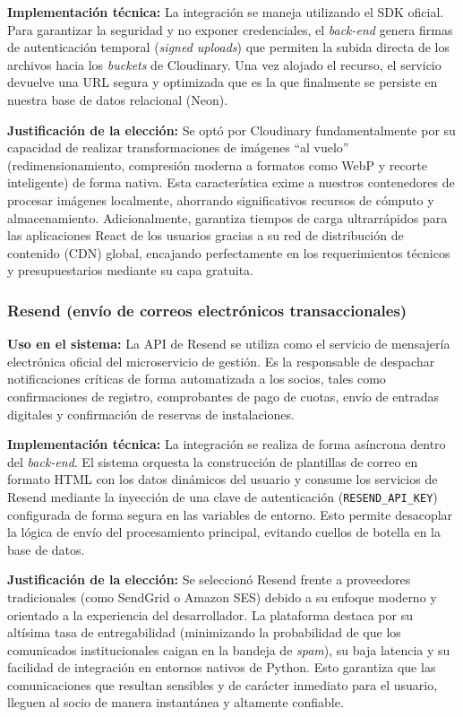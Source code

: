 \textbf{Implementación técnica:} La integración se maneja utilizando el SDK oficial. Para garantizar la seguridad y no exponer credenciales, el \textit{back-end} genera firmas de autenticación temporal (\textit{signed uploads}) que permiten la subida directa de los archivos hacia los \textit{buckets} de Cloudinary. Una vez alojado el recurso, el servicio devuelve una URL segura y optimizada que es la que finalmente se persiste en nuestra base de datos relacional (Neon).

\textbf{Justificación de la elección:} Se optó por Cloudinary fundamentalmente por su capacidad de realizar transformaciones de imágenes ``al vuelo'' (redimensionamiento, compresión moderna a formatos como WebP y recorte inteligente) de forma nativa. Esta característica exime a nuestros contenedores de procesar imágenes localmente, ahorrando significativos recursos de cómputo y almacenamiento. Adicionalmente, garantiza tiempos de carga ultrarrápidos para las aplicaciones React de los usuarios gracias a su red de distribución de contenido (CDN) global, encajando perfectamente en los requerimientos técnicos y presupuestarios mediante su capa gratuita.

\subsubsection{Resend (envío de correos electrónicos transaccionales)}

\textbf{Uso en el sistema:} La API de Resend se utiliza como el servicio de mensajería electrónica oficial del microservicio de gestión. Es la responsable de despachar notificaciones críticas de forma automatizada a los socios, tales como confirmaciones de registro, comprobantes de pago de cuotas, envío de entradas digitales y confirmación de reservas de instalaciones.

\textbf{Implementación técnica:} La integración se realiza de forma asíncrona dentro del \textit{back-end}. El sistema orquesta la construcción de plantillas de correo en formato HTML con los datos dinámicos del usuario y consume los servicios de Resend mediante la inyección de una clave de autenticación (\texttt{RESEND\_API\_KEY}) configurada de forma segura en las variables de entorno. Esto permite desacoplar la lógica de envío del procesamiento principal, evitando cuellos de botella en la base de datos.

\textbf{Justificación de la elección:} Se seleccionó Resend frente a proveedores tradicionales (como SendGrid o Amazon SES) debido a su enfoque moderno y orientado a la experiencia del desarrollador. La plataforma destaca por su altísima tasa de entregabilidad (minimizando la probabilidad de que los comunicados institucionales caigan en la bandeja de \textit{spam}), su baja latencia y su facilidad de integración en entornos nativos de Python. Esto garantiza que las comunicaciones que resultan sensibles y de carácter inmediato para el usuario, lleguen al socio de manera instantánea y altamente confiable.

